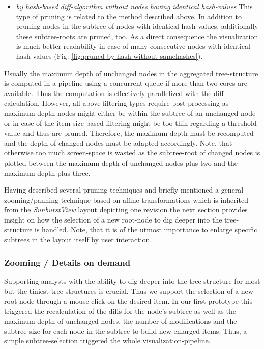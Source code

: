 \begin{itemize}

\item \emph{by hash-based diff-algorithm without nodes having identical hash-values} This type of pruning is related to the method described above. In addition to pruning nodes in the subtree of nodes with identical hash-values, additionally these subtree-roots are pruned, too. As a direct consequence the visualization is much better readability in case of many consecutive nodes with identical hash-values (Fig. \ref{fig:pruned-by-hash-without-samehashes}).

\end{itemize}

Usually the maximum depth of unchanged nodes in the aggregated tree-structure is computed in a pipeline using a concurrent queue if more than two cores are available. Thus the computation is effectively parallelized with the diff-calculation. However, all above filtering types require post-processing as maximum depth nodes might either be within the subtree of an unchanged node or in case of the item-size-based filtering might be too thin regarding a threshold value and thus are pruned. Therefore, the maximum depth must be recomputed and the depth of changed nodes must be adapted accordingly. Note, that otherwise too much screen-space is wasted as the subtree-root of changed nodes is plotted between the maximum-depth of unchanged nodes plus two and the maximum depth plus three.

Having described several pruning-techniques and briefly mentioned a general zooming/panning technique based on affine transformations which is inherited from the \emph{SunburstView} layout depicting one revision the next section provides insight on how the selection of a new root-node to dig deeper into the tree-structure is handled. Note, that it is of the utmost importance to enlarge specific subtrees in the layout itself by user interaction. 

\subsubsection{Zooming / Details on demand} 
Supporting analysts with the ability to dig deeper into the tree-structure for most but the tiniest tree-structures is crucial. Thus we support the selection of a new root node through a mouse-click on the desired item. In our first prototype this triggered the recalculation of the diffs for the node's subtree as well as the maximum depth of unchanged nodes, the number of modifications and the subtree-size for each node in the subtree to build new enlarged items. Thus, a simple subtree-selection triggered the whole visualization-pipeline.

